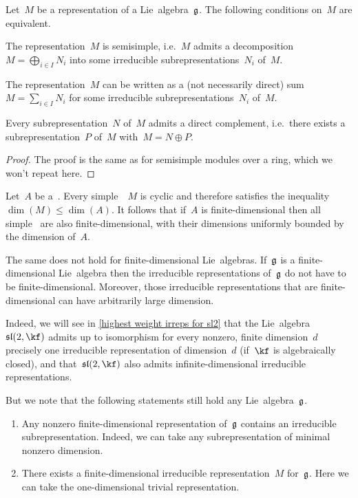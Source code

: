 \begin{proposition}
  Let~$M$ be a representation of a Lie~algebra~$\mathfrak{g}$.
  The following conditions on~$M$ are equivalent.
  \begin{equivalenceslist}
    \item
      The representation~$M$ is semisimple, i.e.~$M$ admits a decomposition~$M = \bigoplus_{i \in I} N_i$ into some irreducible subrepresentations~$N_i$ of~$M$.
    \item
      The representation~$M$ can be written as a (not necessarily direct) sum~$M = \sum_{i \in I} N_i$ for some irreducible subrepresentations~$N_i$ of~$M$.
    \item
      Every subrepresentation~$N$ of~$M$ admits a direct complement, i.e.\ there exists a subrepresentation~$P$ of~$M$ with~$M = N \oplus P$.
  \end{equivalenceslist}
\end{proposition}


\begin{proof}
  The proof is the same as for semisimple modules over a ring, which we won’t repeat here.
\end{proof}


\begin{remark}
  Let~$A$ be a~{\algebra{$\kf$}}.
  Every simple~{}~$M$ is cyclic and therefore satisfies the inequality~$\dim(M) \leq \dim(A)$.
  It follows that if~$A$ is finite-dimensional then all simple~{} are also finite-dimensional, with their dimensions uniformly bounded by the dimension of~$A$.
  
  The same does not hold for finite-dimensional Lie~algebras.
  If~$\mathfrak{g}$ is a finite-dimensional Lie~algebra then the irreducible representations of~$\mathfrak{g}$ do not have to be finite-dimensional.
  Moreover, those irreducible representations that are finite-dimensional can have arbitrarily large dimension.
  
  Indeed, we will see in \cref{highest weight irreps for sl2} that the Lie~algebra~$\sllie(2,\kf)$ admits up to isomorphism for every nonzero, finite dimension~$d$ precisely one irreducible representation of dimension~$d$ (if~$\kf$ is algebraically closed), and that~$\sllie(2,\kf)$ also admits infinite-dimensional irreducible representations.
  
  But we note that the following statements still hold any Lie~algebra~$\mathfrak{g}$.
  \begin{enumerate}
    \item
      Any nonzero finite-dimensional representation of~$\mathfrak{g}$ contains an irreducible subrepresentation.
      Indeed, we can take any subrepresentation of minimal nonzero dimension.
    \item
      There exists a finite-dimensional irreducible representation~$M$ for~$\mathfrak{g}$.
      Here we can take the one-dimensional trivial representation.
  \end{enumerate}
\end{remark}


